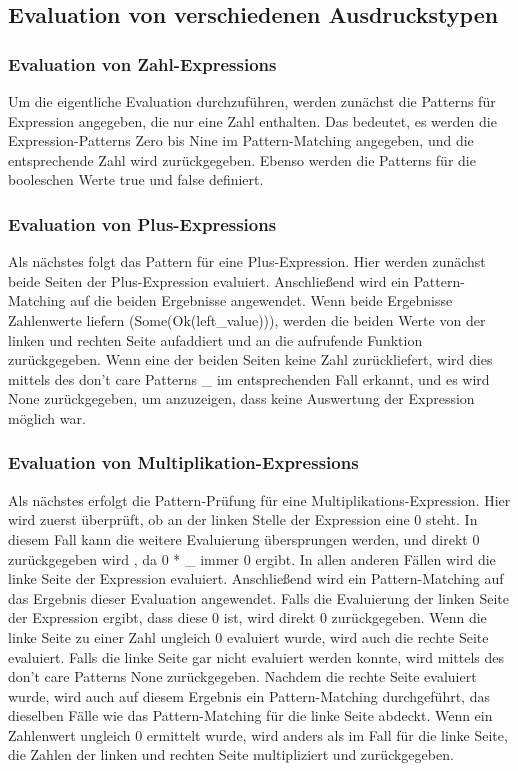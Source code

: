 \documentclass[a4paper, 1ppt]{article}
\begin{document}
\subsection{Evaluation von verschiedenen Ausdruckstypen}
\subsubsection{Evaluation von Zahl-Expressions}
Um die eigentliche Evaluation durchzuführen, werden zunächst die Patterns für Expression angegeben, die nur eine Zahl enthalten. Das bedeutet, es werden die Expression-Patterns Zero bis Nine im Pattern-Matching angegeben, und die entsprechende Zahl wird zurückgegeben. Ebenso werden die Patterns für die booleschen Werte true und false definiert.
\subsubsection{Evaluation von Plus-Expressions}
Als nächstes folgt das Pattern für eine Plus-Expression. Hier werden zunächst beide Seiten der Plus-Expression evaluiert. Anschließend wird ein Pattern-Matching auf die beiden Ergebnisse angewendet. Wenn beide Ergebnisse Zahlenwerte liefern (Some(Ok(left\_value))), werden die beiden Werte von der linken und rechten Seite aufaddiert und an die aufrufende Funktion zurückgegeben. Wenn eine der beiden Seiten keine Zahl zurückliefert, wird dies mittels des don't care Patterns \_ im entsprechenden Fall erkannt, und es wird None zurückgegeben, um anzuzeigen, dass keine Auswertung der Expression möglich war.
\subsubsection{Evaluation von Multiplikation-Expressions}
Als nächstes erfolgt die Pattern-Prüfung für eine Multiplikations-Expression. Hier wird zuerst überprüft, ob an der linken Stelle der Expression eine 0 steht. In diesem Fall kann die weitere Evaluierung übersprungen werden, und direkt 0 zurückgegeben wird , da 0 * \_ immer 0 ergibt. In allen anderen Fällen wird die linke Seite der Expression evaluiert. Anschließend wird ein Pattern-Matching auf das Ergebnis dieser Evaluation angewendet. Falls die Evaluierung der linken Seite der Expression ergibt, dass diese 0 ist, wird direkt 0 zurückgegeben. Wenn die linke Seite zu einer Zahl ungleich 0 evaluiert wurde, wird auch die rechte Seite evaluiert. Falls die linke Seite gar nicht evaluiert werden konnte, wird mittels des don't care Patterns None zurückgegeben. Nachdem die rechte Seite evaluiert wurde, wird auch auf diesem Ergebnis ein Pattern-Matching durchgeführt, das dieselben Fälle wie das Pattern-Matching für die linke Seite abdeckt. Wenn ein Zahlenwert ungleich 0 ermittelt wurde, wird anders als im Fall für die linke Seite, die Zahlen der linken und rechten Seite multipliziert und zurückgegeben.
\end{document}
